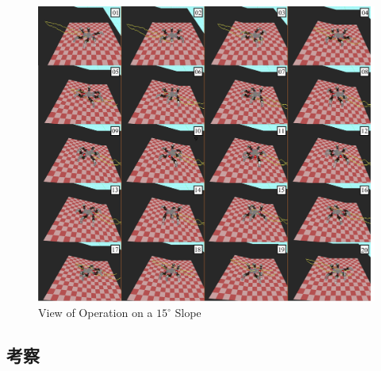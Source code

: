 \begin{figure}[htbp]
  \begin{center}
    \includegraphics[width=1.0\linewidth]{figure/chapter4/integration/15deg_view.png}
    \caption{View of Operation on a $15^{\circ}$ Slope}
    \label{fig:ch4_result_integration_view_15deg}  %
  \end{center}
\end{figure}



\subsection{考察}
